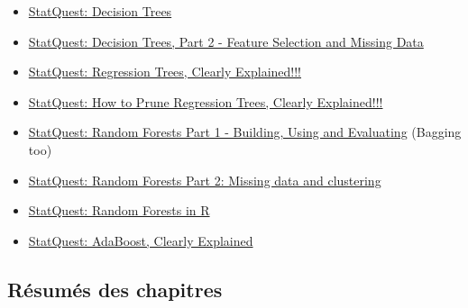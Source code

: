 \documentclass[12pt, titlepage, french]{report}
\begin{document}
\begin{YTB_vids}
\begin{itemize}
	\item	\href{https://www.youtube.com/watch?v=7VeUPuFGJHk&list=PLblh5JKOoLUICTaGLRoHQDuF_7q2GfuJF&index=34}{StatQuest: Decision Trees}
	\item	\href{https://www.youtube.com/watch?v=wpNl-JwwplA&list=PLblh5JKOoLUICTaGLRoHQDuF_7q2GfuJF&index=35}{StatQuest: Decision Trees, Part 2 - Feature Selection and Missing Data}
	\item	\hyperref[TREES-REGRESSION]{StatQuest: Regression Trees, Clearly Explained!!!}
	\item	\hyperref[TREES-PRUNING]{StatQuest: How to Prune Regression Trees, Clearly Explained!!!}
	\item	\href{https://www.youtube.com/watch?v=J4Wdy0Wc_xQ}{StatQuest: Random Forests Part 1 - Building, Using and Evaluating} (Bagging too)
	\item	\href{https://www.youtube.com/watch?v=sQ870aTKqiM}{StatQuest: Random Forests Part 2: Missing data and clustering}
	\item	\href{https://www.youtube.com/watch?v=6EXPYzbfLCE}{StatQuest: Random Forests in R}
	\item	\href{https://www.youtube.com/watch?v=LsK-xG1cLYA}{StatQuest: AdaBoost, Clearly Explained}
\end{itemize}
\end{YTB_vids}

\subsection{Résumés des chapitres}
\end{document}
